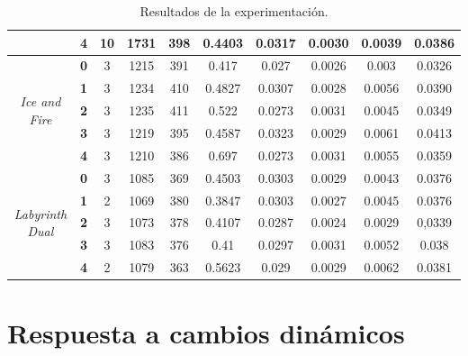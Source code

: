 \begin{landscape}
\begin{table}[]
{\begin{tabular}{|c|c|cccccccc|}
                                         & \textbf{4} & 10 & 1731 & 398 & 0.4403 & 0.0317 & 0.0030 & 0.0039 & 0.0386 \\ \hline
\multirow{5}{*}{\textit{Ice and Fire}}   & \textbf{0} & 3  & 1215 & 391 & 0.417  & 0.027  & 0.0026 & 0.003  & 0.0326 \\ \cline{2-10} 
                                         & \textbf{1} & 3  & 1234 & 410 & 0.4827 & 0.0307 & 0.0028 & 0.0056 & 0.0390 \\ \cline{2-10} 
                                         & \textbf{2} & 3  & 1235 & 411 & 0.522  & 0.0273 & 0.0031 & 0.0045 & 0.0349 \\ \cline{2-10} 
                                         & \textbf{3} & 3  & 1219 & 395 & 0.4587 & 0.0323 & 0.0029 & 0.0061 & 0.0413 \\ \cline{2-10} 
                                         & \textbf{4} & 3  & 1210 & 386 & 0.697  & 0.0273 & 0.0031 & 0.0055 & 0.0359 \\ \hline
\multirow{5}{*}{\textit{Labyrinth Dual}} & \textbf{0} & 3  & 1085 & 369 & 0.4503 & 0.0303 & 0.0029 & 0.0043 & 0.0376 \\ \cline{2-10} 
                                         & \textbf{1} & 2  & 1069 & 380 & 0.3847 & 0.0303 & 0.0027 & 0.0045 & 0.0376 \\ \cline{2-10} 
                                         & \textbf{2} & 3  & 1073 & 378 & 0.4107 & 0.0287 & 0.0024 & 0.0029 & 0,0339 \\ \cline{2-10} 
                                         & \textbf{3} & 3  & 1083 & 376 & 0.41   & 0.0297 & 0.0031 & 0.0052 & 0.038  \\ \cline{2-10} 
                                         & \textbf{4} & 2  & 1079 & 363 & 0.5623 & 0.029  & 0.0029 & 0.0062 & 0.0381 \\ \hline
\end{tabular}%
}
\caption{Resultados de la experimentación.}
\label{tab:exp-results}
\end{table}
\end{landscape}

\section{Respuesta a cambios dinámicos}
